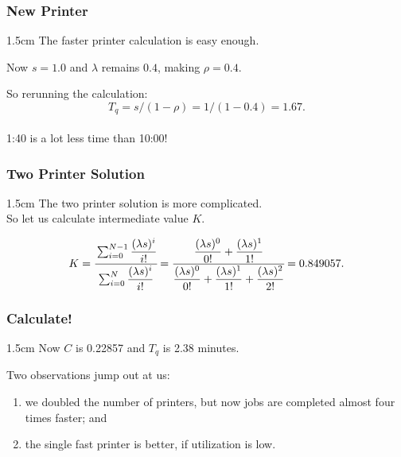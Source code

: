 \begin{frame}
\frametitle{New Printer}

\large
\begin{changemargin}{1.5cm}
The faster printer calculation is easy enough. 

Now $s = 1.0$ and $\lambda$ remains $0.4$, making $\rho = 0.4$. 

So rerunning the calculation: 
\[ T_{q} = s / (1 - \rho ) = 1 / (1 - 0.4 ) = 1.67.\]
~\\[0em]

1:40 is a lot less time than 10:00! 
\end{changemargin}

\end{frame}



\begin{frame}
\frametitle{Two Printer Solution}

\large
\begin{changemargin}{1.5cm}
The two printer solution is more complicated. \\
So let us calculate intermediate value $K$.

	\[ K = \cfrac{\sum_{i=0}^{N-1}\dfrac{(\lambda s)^{i}}{i!}}{{\sum_{i=0}^{N}\dfrac{(\lambda s)^{i}}{i!}}} = \cfrac{\dfrac{(\lambda s)^{0}}{0!} + \dfrac{(\lambda s)^{1}}{1!}}{\dfrac{(\lambda s)^{0}}{0!} + \dfrac{(\lambda s)^{1}}{1!} + \dfrac{(\lambda s)^{2}}{2!}} = 0.849057.
\]
	
\end{changemargin}
\end{frame}



\begin{frame}
\frametitle{Calculate!}

\large
\begin{changemargin}{1.5cm}
Now $C$ is 0.22857 and $T_{q}$ is 2.38 minutes. 

Two observations jump out at us: \\[0em]
\begin{enumerate}
\item we doubled the number of printers, but now jobs are completed almost four times faster; and 
\item the single fast printer is better, if utilization is low.
\end{enumerate}
\end{changemargin}
\end{frame}



